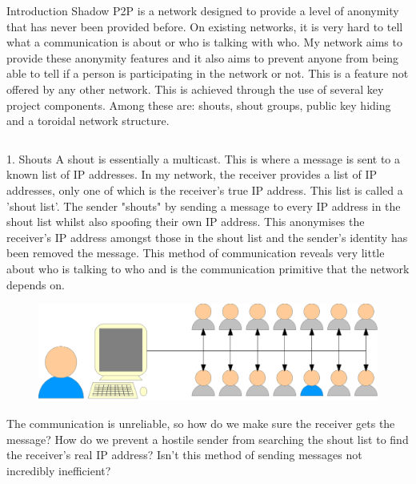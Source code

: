 \documentclass[ %
                    author={Luke Murray},
                supervisor={Dr. Simon Hollis},
                     title={Shadow Peer-to-Peer Networks},
                  subtitle={},
                    degree={MEng},
                      year={2013} ]{poster}
\begin{document}

\begin{frame}{} 

\vfill

\begin{columns}[t]
    \begin{column}{0.900\linewidth}
    \begin{block}{\normalsize Introduction}
    \small Shadow P2P is a network designed to provide a level of anonymity that has never been provided before. On existing networks, it is very hard to tell what a communication is about or who is talking with who. My network aims to provide these anonymity features and it also aims to prevent anyone from being able to tell if a person is participating in the network or not. This is a feature not offered by any other network. This is achieved through the use of several key project components. Among these are: shouts, shout groups, public key hiding and a toroidal network structure.
    \end{block}
    \end{column}
\end{columns}

\vfill

\begin{columns}[t]
    \begin{column}{0.422\linewidth}
    \begin{block}{\normalsize 1. Shouts}
    \small A shout is essentially a multicast. This is where a message is sent to a known list of IP addresses. In my network, the receiver provides a list of IP addresses, only one of which is the receiver's true IP address. This list is called a 'shout list'. The sender "shouts" by sending a message to every IP address in the shout list whilst also spoofing their own IP address. This anonymises the receiver's IP address amongst those in the shout list and the sender's identity has been removed the message. This method of communication reveals very little about who is talking to who and is the communication primitive that the network depends on.
    \begin{figure}[h]
        \includegraphics{diagrams/poster_d2.eps}
    \end{figure}
    The communication is unreliable, so how do we make sure the receiver gets the message? How do we prevent a hostile sender from searching the shout list to find the receiver's real IP address? Isn't this method of sending messages not incredibly inefficient?
    \end{block}
    \end{column}


\end{columns}
\end{frame}
\end{document}
